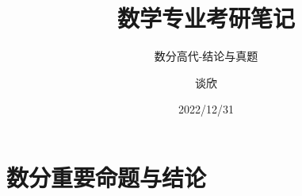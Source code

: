 \documentclass[lang=cn,newtx,12pt,scheme=chinese]{elegantbook}
\title{数学专业考研笔记}
\subtitle{数分高代-结论与真题}
\author{谈欣}
\institute{湖北第二师范学院数学与统计学院}
\date{2022/12/31}
\begin{document}
	
	\maketitle\frontmatter\tableofcontents\mainmatter
	
	\chapter{数分重要命题与结论}\newpage
	
	
	\newpage
	
	
	
	\newpage
	
	\newpage
	\newpage
	\newpage
	
	\newpage
	\newpage
	\newpage
	
	\newpage
	\newpage
	
	\newpage
	\newpage
	\newpage
	
	\newpage
	\newpage
	
	\newpage
	\newpage
	\newpage
	\newpage
	\newpage
	
	\newpage
	
	\newpage
	
	\newpage
	\newpage
	
	\newpage
	\newpage
	\newpage
	
	\newpage
	\newpage
	
	
	
	
	
	
	
	
	
	
\end{document}
